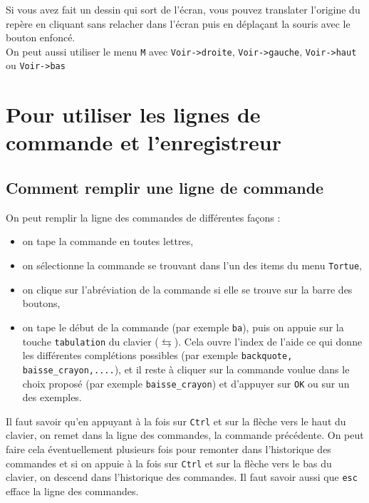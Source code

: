 \documentclass[a4paper,11pt]{book}
\begin{document}
Si vous avez fait un dessin qui sort de l'\'ecran, vous pouvez translater 
l'origine du rep\`ere en cliquant sans relacher dans l'\'ecran puis en 
d\'epla\c{c}ant la souris avec le bouton enfonc\'e.\\
On peut aussi utiliser le menu {\tt M} avec {\tt Voir->droite},
{\tt Voir->gauche}, {\tt Voir->haut} ou {\tt Voir->bas}
\section{Pour utiliser les lignes de commande et l'enregistreur}\label{sec:enregis}
\subsection{Comment remplir une ligne de commande}
On peut remplir la ligne des commandes de diff\'erentes fa\c{c}ons :
\begin{itemize}
\item on tape la commande en toutes lettres,
\item on  s\'electionne la commande se trouvant dans l'un des items du menu 
 {\tt Tortue},
\item on clique sur l'abr\'eviation de la commande si elle se trouve sur 
 la  barre des boutons,
\item on tape le d\'ebut de la commande (par exemple {\tt ba}), puis on 
appuie sur la touche {\tt tabulation} du clavier ($\leftrightarrows$). Cela 
ouvre l'index de l'aide ce qui donne les diff\'erentes compl\'etions possibles 
(par exemple {\tt backquote, baisse\_crayon,....}), et il reste \`a
cliquer sur la commande voulue dans le choix propos\'e (par exemple 
{\tt baisse\_crayon}) et d'appuyer sur {\tt OK} ou sur un des exemples. 
\end{itemize}
 Il faut savoir qu'en appuyant \`a la fois sur {\tt Ctrl} et sur
la fl\`eche vers le haut du clavier, on remet dans la ligne des commandes, 
la commande pr\'ec\'edente. On peut faire cela \'eventuellement plusieurs 
fois pour remonter dans l'historique des commandes et si on appuie \`a la fois 
sur {\tt Ctrl} et sur la fl\`eche vers le bas du clavier, on descend dans 
l'historique des commandes. Il faut savoir aussi que {\tt esc} efface la ligne 
des commandes.
\end{document}
